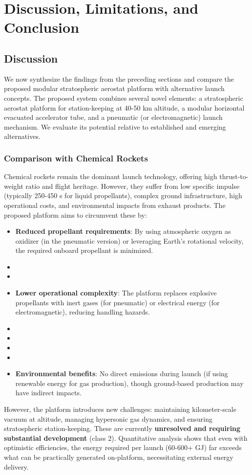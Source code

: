 \section{Discussion, Limitations, and Conclusion}
\label{sec:discussion}

\subsection{Discussion}
We now synthesize the findings from the preceding sections and compare the proposed modular stratospheric aerostat platform with alternative launch concepts. The proposed system combines several novel elements: a stratospheric aerostat platform for station-keeping at 40-50 km altitude, a modular horizontal evacuated accelerator tube, and a pneumatic (or electromagnetic) launch mechanism. We evaluate its potential relative to established and emerging alternatives.

\subsubsection{Comparison with Chemical Rockets}
Chemical rockets remain the dominant launch technology, offering high thrust-to-weight ratio and flight heritage. However, they suffer from low specific impulse (typically 250-450 s for liquid propellants), complex ground infrastructure, high operational costs, and environmental impacts from exhaust products. The proposed platform aims to circumvent these by:
\begin{itemize}
    \item \textbf{Reduced propellant requirements}: By using atmospheric oxygen as oxidizer (in the pneumatic version) or leveraging Earth's rotational velocity, the required onboard propellant is minimized.
    \item \item \item \textbf{Lower operational complexity}: The platform replaces explosive propellants with inert gases (for pneumatic) or electrical energy (for electromagnetic), reducing handling hazards.
    \item \item \item \item \item \textbf{Environmental benefits}: No direct emissions during launch (if using renewable energy for gas production), though ground-based production may have indirect impacts.
\end{itemize}
However, the platform introduces new challenges: maintaining kilometer-scale vacuum at altitude, managing hypersonic gas dynamics, and ensuring stratospheric station-keeping. These are currently \textbf{unresolved and requiring substantial development} (class 2). Quantitative analysis shows that even with optimistic efficiencies, the energy required per launch (60-600+ GJ) far exceeds what can be practically generated on-platform, necessitating external energy delivery.

